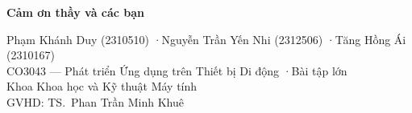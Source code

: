 \documentclass[aspectratio=169]{beamer}
\begin{document}





\begin{frame}
    \centering
    \vspace{0.3cm}
    \textbf{\Huge{Cảm ơn thầy và các bạn}}\\
    \vspace{0.55cm}

    {\small Phạm Khánh Duy (2310510) \quad·\quad Nguyễn Trần Yến Nhi (2312506) \quad·\quad Tăng Hồng Ái (2310167)}\\
    \vspace{0.25cm}
    {\small CO3043 --- Phát triển Ứng dụng trên Thiết bị Di động \quad·\quad Bài tập lớn}\\
    \vspace{0.15cm}
    {\scriptsize \color{TextGray} Khoa Khoa học và Kỹ thuật Máy tính\\[0.5mm]
    GVHD: TS.\ Phan Trần Minh Khuê}
\end{frame}
\end{document}
